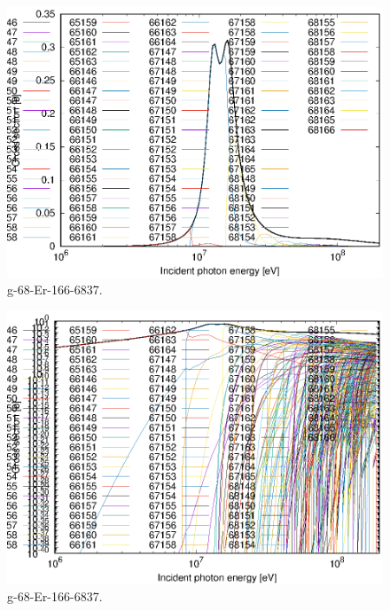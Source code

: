 \begin{figure}
 \includegraphics[width=\linewidth]{eps/g_68-Er-166_6837.eps}
  \caption{g-68-Er-166-6837.}
\end{figure}
\begin{figure}
 \includegraphics[width=\linewidth]{eps-log/g_68-Er-166_6837.eps}
 \caption{g-68-Er-166-6837.}
\end{figure}
\newpage \clearpage

